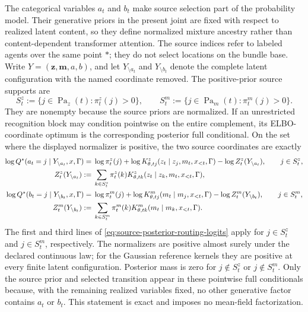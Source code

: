 The categorical variables $a_t$ and $b_t$ make source selection part of the probability model. Their generative priors in the present joint are fixed with respect to realized latent content, so they define normalized mixture ancestry rather than content-dependent transformer attention. The source indices refer to labeled agents over the same point $\ast$; they do not select locations on the bundle base. Write $Y=(\boldsymbol z,\boldsymbol m,a,b)$, and let $Y_{\setminus a_t}$ and $Y_{\setminus b_t}$ denote the complete latent configuration with the named coordinate removed. The positive-prior source supports are
\begin{equation}
S_t^z
:=\{j\in\operatorname{Pa}_z(t):\pi_t^z(j)>0\},
\qquad
S_t^m
:=\{j\in\operatorname{Pa}_m(t):\pi_t^m(j)>0\}.
\label{eq:positive-source-prior-supports}
\end{equation}
They are nonempty because the source priors are normalized. If an unrestricted recognition block may condition pointwise on the entire complement, its ELBO-coordinate optimum is the corresponding posterior full conditional. On the set where the displayed normalizer is positive, the two source coordinates are exactly
\begin{equation}
\begin{aligned}
\log Q^\star(a_t=j\mid Y_{\setminus a_t},x,\Gamma)
={}&\log\pi_t^z(j)
+\log K^z_{\theta,tj}
(z_t\mid z_j,m_t,x_{<t},\Gamma)
-\log Z_t^z(Y_{\setminus a_t}),
\qquad j\in S_t^z,\\
Z_t^z(Y_{\setminus a_t})
:={}&\sum_{k\in S_t^z}
\pi_t^z(k)
K^z_{\theta,tk}
(z_t\mid z_k,m_t,x_{<t},\Gamma),\\
\log Q^\star(b_t=j\mid Y_{\setminus b_t},x,\Gamma)
={}&\log\pi_t^m(j)
+\log K^m_{\theta,tj}
(m_t\mid m_j,x_{<t},\Gamma)
-\log Z_t^m(Y_{\setminus b_t}),
\qquad j\in S_t^m,\\
Z_t^m(Y_{\setminus b_t})
:={}&\sum_{k\in S_t^m}
\pi_t^m(k)
K^m_{\theta,tk}
(m_t\mid m_k,x_{<t},\Gamma).
\end{aligned}
\label{eq:source-posterior-routing-logits}
\end{equation}
The first and third lines of \cref{eq:source-posterior-routing-logits} apply for $j\in S_t^z$ and $j\in S_t^m$, respectively. The normalizers are positive almost surely under the declared continuous law; for the Gaussian reference kernels they are positive at every finite latent configuration. Posterior mass is zero for $j\notin S_t^z$ or $j\notin S_t^m$. Only the source prior and selected transition appear in these pointwise full conditionals because, with the remaining realized variables fixed, no other generative factor contains $a_t$ or $b_t$. This statement is exact and imposes no mean-field factorization.

